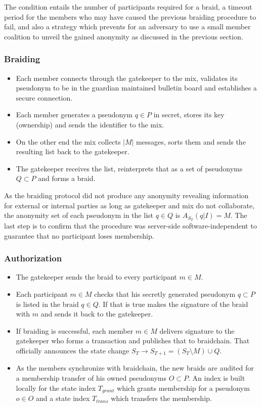 \documentclass[12pt]{article}
\begin{document}
The condition entails the number of participants required for a braid, a timeout period for the members who may have caused the previous braiding procedure to fail, and also a strategy which prevents for an adversary to use a small member coalition to unveil the gained anonymity as discussed in the previous section.

\subsubsection*{Braiding}

\begin{itemize}
\item Each member connects through the gatekeeper to the mix, validates its pseudonym to be in the guardian maintained bulletin board and establishes a secure connection.
\item Each member generates a pseudonym $q \in P$ in secret, stores its key (ownership) and sends the identifier to the mix.
\item On the other end the mix collects $|M|$ messages, sorts them and sends the resulting list back to the gatekeeper.
\item The gatekeeper receives the list, reinterprets that as a set of pseudonyms $Q \subset P$ and forms a braid.
\end{itemize}

As the braiding protocol did not produce any anonymity revealing information for external or internal parties as long as gatekeeper and mix do not collaborate, the anonymity set of each pseudonym in the list $q \in Q$ is $A_{S_T}(q|I) = M$. The last step is to confirm that the procedure was server-side software-independent to guarantee that no participant loses membership.

\subsubsection*{Authorization}

\begin{itemize}
\item The gatekeeper sends the braid to every participant $m \in M$.
\item Each participant $m \in M$ checks that his secretly generated pseudonym $q \subset P$ is listed in the braid $q \in Q$. If that is true makes the signature of the braid with $m$ and sends it back to the gatekeeper.
\item If braiding is successful, each member $m \in M$ delivers signature to the gatekeeper who forms a transaction and publishes that to braidchain. That officially announces the state change $S_T \to S_{T+1} = (S_T \setminus M) \cup Q$.
\item As the members synchronize with braidchain, the new braids are audited for a membership transfer of his owned pseudonyms $O \subset P$. An index is built locally for the state index $T_{grant}$ which grants membership for a pseudonym $o \in O$ and a state index $T_{trans}$ which transfers the membership. 
\end{itemize}
\end{document}
